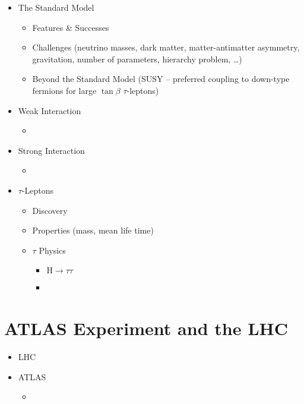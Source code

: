 \begin{itemize}
\item The Standard Model
  \begin{itemize}
  \item Features \& Successes
  \item Challenges (neutrino masses, dark matter, matter-antimatter asymmetry,
    gravitation, number of parameters, hierarchy problem, \ldots)
  \item Beyond the Standard Model (SUSY -- preferred coupling to down-type fermions for large $\tan\beta$ \textrightarrow $\tau$-leptons)
  \end{itemize}

\item Weak Interaction
\begin{itemize}
\item
\end{itemize}

\item Strong Interaction
\begin{itemize}
\item
\end{itemize}

\item $\tau$-Leptons
\begin{itemize}
\item Discovery
\item Properties (mass, mean life time)
\item $\tau$ Physics
  \begin{itemize}
  \item $\mathrm{H} \rightarrow \tau \tau$
  \item
  \end{itemize}

\end{itemize}


\end{itemize}

\section{ATLAS Experiment and the LHC}

\begin{itemize}
\item LHC

\item ATLAS
\begin{itemize}
\item
\end{itemize}
\end{itemize}

